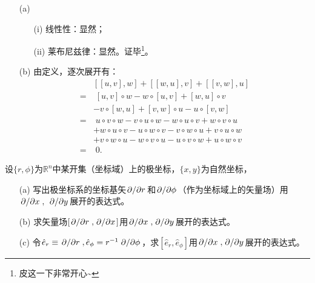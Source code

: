 \begin{xiti}
    \begin{zm}
    	\begin{enumerate}
    		\item[(a)]
    		\begin{enumerate}
    			\item[(i)] 线性性：显然；
    			\item[(ii)] 莱布尼兹律：显然。证毕\footnote{皮这一下非常开心\textasciitilde {}}。
    		\end{enumerate}
    	    \item[(b)] 由定义，逐次展开有：
    	    \begin{equation*}
    	    \begin{split}
    	    &[[u,v],w]+[[w,u],v]+[[v,w],u]\\
    	    =&\;[u,v]\circ w-w \circ [u,v]+[w,u]\circ v\\
    	    &-v \circ [w,u]+[v,w]\circ u -u\circ [v,w]\\
    	    =&\;u\circ v\circ w-v\circ u\circ w-w\circ u\circ v+w\circ v\circ u\\
    	    &+w\circ u\circ v-u\circ w\circ v-v\circ w\circ u+v\circ u\circ w\\
    	    &+v\circ w\circ u-w\circ v\circ u-u\circ v\circ w+u\circ w\circ v\\
    	    =&\;0.
    	    \end{split}
    	    \end{equation*}
    	\end{enumerate}
    \end{zm}

    \item 设$\{r,\phi\}$为$\mathbb{R}^n$中某开集（坐标域）上的极坐标，$\{x,y\}$为自然坐标，
    \begin{enumerate}
    	\item[(a)] 写出极坐标系的坐标基矢$\pdv*{}{r}$和$\pdv*{}{\phi}$（作为坐标域上的矢量场）用$\pdv*{}{x},\ \pdv*{}{y}$展开的表达式。
    	\item[(b)] 求矢量场$[\pdv*{}{r},\pdv*{}{x}]$用$\pdv*{}{x},\pdv*{}{y}$展开的表达式。
    	\item[(c)] 令$\hat{e}_r\equiv\pdv*{}{r},\hat{e}_\phi=r^{-1}\pdv*{}{\phi}$，求$[\hat{e}_r,\hat{e}_\phi]$用$\pdv*{}{x},\pdv*{}{y}$展开的表达式。
    \end{enumerate}


\end{xiti}
